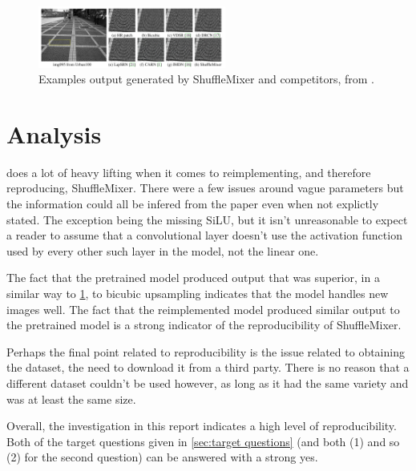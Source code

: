 \documentclass{article}
\begin{document}
    \begin{figure}
        \centering
        \includegraphics[width=0.55\textwidth]{pavement.png}
        \caption{Examples output generated by ShuffleMixer and competitors, from \citet{sun2022shufflemixer}.} \label{fig:original_output}
    \end{figure}
    
    \section{Analysis}

     does a lot of heavy lifting when it comes to reimplementing, and therefore reproducing, ShuffleMixer. There were a few issues around vague parameters but the information could all be infered from the paper even when not explictly stated. The exception being the missing SiLU, but it isn't unreasonable to expect a reader to assume that a convolutional layer doesn't use the activation function used by every other such layer in the model, not the linear one.

    The fact that the pretrained model produced output that was superior, in a similar way to \cref{fig:original_output}, to bicubic upsampling indicates that the model handles new images well. The fact that the reimplemented model produced similar output to the pretrained model is a strong indicator of the reproducibility of ShuffleMixer.

    Perhaps the final point related to reproducibility is the issue related to obtaining the dataset, the need to download it from a third party. There is no reason that a different dataset couldn't be used however, as long as it had the same variety and was at least the same size.

    Overall, the investigation in this report indicates a high level of reproducibility. Both of the target questions given in \cref{sec:target questions} (and both (1) and so (2) for the second question) can be answered with a strong yes.


    
    

    \newpage

    \appendix
\end{document}
